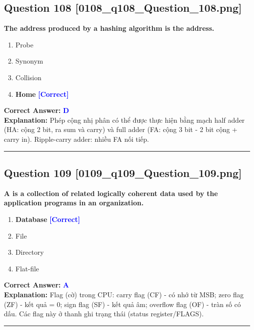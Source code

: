 \documentclass[11pt,a4paper]{article}
\begin{document}
\begin{minipage}{\textwidth}
\subsection*{Question 108 \quad \footnotesize{[0108\_q108\_Question\_108.png]}}
\noindent \textbf{The address produced by a hashing algorithm is the address.}

\begin{enumerate}[label=\Alph*.]
    \item Probe
    \item Synonym
    \item Collision
    \item \textbf{Home} \hfill \textcolor{blue}{\textbf{[Correct]}}
\end{enumerate}

\noindent \textbf{Correct Answer:} \textcolor{blue}{\textbf{D}} \\[2pt]
\noindent \textbf{Explanation:} Phép cộng nhị phân có thể được thực hiện bằng mạch half adder (HA: cộng 2 bit, ra sum và carry) và full adder (FA: cộng 3 bit - 2 bit cộng + carry in). Ripple-carry adder: nhiều FA nối tiếp.

\par\vspace{0.3cm}
\hrule
\vspace{0.3cm}
\end{minipage}

\begin{minipage}{\textwidth}
\subsection*{Question 109 \quad \footnotesize{[0109\_q109\_Question\_109.png]}}
\noindent \textbf{A is a collection of related logically coherent data used by the application programs in an organization.}

\begin{enumerate}[label=\Alph*.]
    \item \textbf{Database} \hfill \textcolor{blue}{\textbf{[Correct]}}
    \item File
    \item Directory
    \item Flat-file
\end{enumerate}

\noindent \textbf{Correct Answer:} \textcolor{blue}{\textbf{A}} \\[2pt]
\noindent \textbf{Explanation:} Flag (cờ) trong CPU: carry flag (CF) - có nhớ từ MSB; zero flag (ZF) - kết quả = 0; sign flag (SF) - kết quả âm; overflow flag (OF) - tràn số có dấu. Các flag này ở thanh ghi trạng thái (status register/FLAGS).

\par\vspace{0.3cm}
\hrule
\vspace{0.3cm}
\end{minipage}
\end{document}
